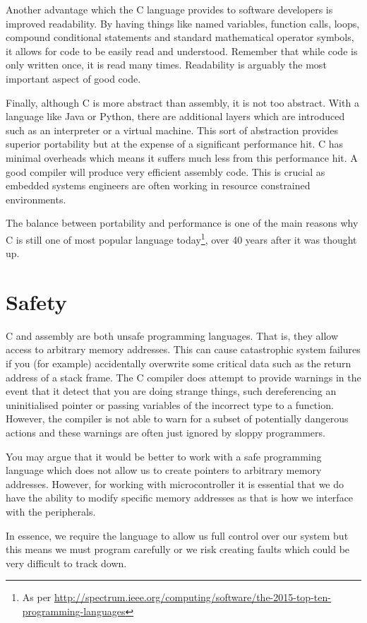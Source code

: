 Another advantage which the C language provides to software developers is improved readability. 
By having things like named variables, function calls, loops, compound conditional statements and standard mathematical operator symbols, it allows for code to be easily read and understood. 
Remember that while code is only written once, it is read many times. Readability is arguably the most important aspect of good code.

Finally, although C is more abstract than assembly, it is not too abstract. With a language like Java or Python, there are additional layers which are introduced such as an interpreter or a virtual machine. This sort of abstraction provides superior portability but at the expense of a significant performance hit. C has minimal overheads which means it suffers much less from this performance hit.
A good compiler will produce very efficient assembly code.
This is  crucial as embedded systems engineers are often working in resource constrained environments.

The balance between portability and performance is one of the main reasons why C is still one of most popular language today\footnote{As per \url{http://spectrum.ieee.org/computing/software/the-2015-top-ten-programming-languages}}, over 40 years after it was thought up. 

\section{Safety}
C and assembly are both unsafe programming languages. That is, they allow access to arbitrary memory addresses. This can cause catastrophic system failures if you (for example) accidentally overwrite some critical data such as the return address of a stack frame.
The C compiler does attempt to provide warnings in the event that it detect that you are doing strange things, such dereferencing an uninitialised pointer or passing variables of the incorrect type to a function. However, the compiler is not able to warn for a subset of potentially dangerous actions and these warnings are often just ignored by sloppy programmers. 

You may argue that it would be better to work with a safe programming language which does not allow us to create pointers to arbitrary memory addresses. However, for working with microcontroller it is essential that we do have the ability to modify specific memory addresses as that is how we interface with the peripherals. 

In essence, we require the language to allow us full control over our system but this means we must program carefully or we risk creating faults which could be very difficult to track down.


